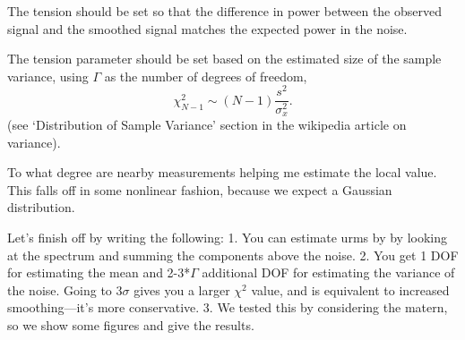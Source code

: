 \documentclass[twocol]{ametsoc}
\begin{document}
{{The tension should be set so that the difference in power between the observed signal and the smoothed signal matches the expected power in the noise.

The tension parameter should be set based on the estimated size of the sample variance, using $\Gamma$ as the number of degrees of freedom,
\begin{equation}
\chi^2_{N-1} \sim (N-1) \frac{s^2}{\sigma_x^2}.
\end{equation}
(see `Distribution of Sample Variance' section in the wikipedia article on variance).

To what degree are nearby measurements helping me estimate the local value. This falls off in some nonlinear fashion, because we expect a Gaussian distribution.

Let's finish off by writing the following:
1. You can estimate urms by by looking at the spectrum and summing the components above the noise.
2. You get 1 DOF for estimating the mean and 2-3*$\Gamma$ additional DOF for estimating the variance of the noise. Going to $3 \sigma$ gives you a larger $\chi^2$ value, and is equivalent to increased smoothing---it's more conservative.
3. We tested this by considering the matern, so we show some figures and give the results.




}}
\end{document}
